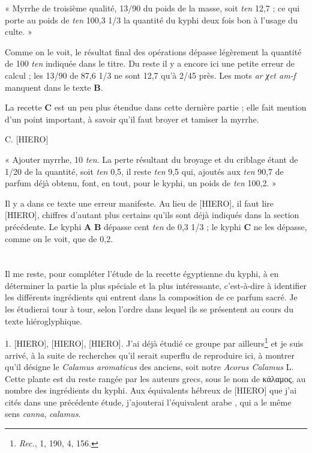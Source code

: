 \documentclass[a4paper, 11pt, oneside]{article}
\newcommand*\arabicAAAC{}
\begin{document}
« Myrrhe de troisième qualité, 13/90 du poids de la masse, soit \emph{ten} 12,7 ; ce qui porte au poids de \emph{ten} 100,3 1/3 la quantité du kyphi deux fois bon à l'usage du culte. »

Comme on le voit, le résultat final des opérations dépasse légèrement la quantité de 100 \emph{ten} indiquée dans le titre. Du reste il y a encore ici une petite erreur de calcul ; les 13/90 de 87,6 1/3 ne sont 12,7 qu'à 2/45 près. Les mots \emph{ar χet am-f} manquent dans le texte \textbf{B}.

La recette \textbf{C} est un peu plus étendue dans cette dernière partie ; elle fait mention d'un point important, à savoir qu'il faut broyer et tamiser la myrrhe.

C. [HIERO]

« Ajouter myrrhe, 10 \emph{ten}. La perte résultant du broyage et du criblage étant de 1/20 de la quantité, soit \emph{ten} 0,5, il reste \emph{ten} 9,5 qui, ajoutés aux \emph{ten} 90,7 de parfum déjà obtenu, font, en tout, pour le kyphi, un poids de \emph{ten} 100,2. »

Il y a dans ce texte une erreur manifeste. Au lieu de [HIERO], il faut lire [HIERO], chiffres d'autant plus certains qu'ils sont déjà indiqués dans la section précédente. Le kyphi \textbf{A} \textbf{B} dépasse cent \emph{ten} de 0,3 1/3 ; le kyphi \textbf{C} ne les dépasse, comme on le voit, que de 0,2.
\clearpage
\section{}
\paragraph{}
Il me reste, pour compléter l'étude de la recette égyptienne du kyphi, à en déterminer la partie la plus spéciale et la plus intéressante, c'est-à-dire à identifier les différents ingrédients qui entrent dans la composition de ce parfum sacré. Je les étudierai tour à tour, selon l'ordre dans lequel ils se présentent au cours du texte hiéroglyphique.

1. [HIERO], [HIERO], [HIERO]. J'ai déjà étudié ce groupe par ailleurs\footnote{\emph{Rec.}, 1, 190, 4, 156.} et je suis arrivé, à la suite de recherches qu'il serait superflu de reproduire ici, à montrer qu'il désigne le \emph{Calamus aromaticus} des anciens, soit notre \emph{Acorus Calamus} L. Cette plante est du reste rangée par les auteurs grecs, sous le nom de κάλαμος, au nombre des ingrédients du kyphi. Aux équivalents hébreux de [HIERO] que j'ai cités dans une précédente étude, j'ajouterai l'équivalent arabe $\arabicAAAC$, qui a le même sens \emph{canna}, \emph{calamus}.
\end{document}
